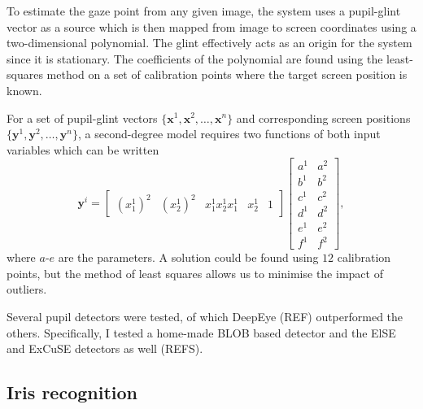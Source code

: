 To estimate the gaze point from any given image, the system uses a pupil-glint vector as a source which is then mapped from image to screen coordinates using a two-dimensional polynomial. The glint effectively acts as an origin for the system since it is stationary. The coefficients of the polynomial are found using the least-squares method on a set of calibration points where the target screen position is known.

For a set of pupil-glint vectors $\{\mathbf{x}^1, \mathbf{x}^2, \dots, \mathbf{x}^n\}$ and corresponding screen positions $\{\mathbf{y}^1, \mathbf{y}^2, \dots, \mathbf{y}^n\}$, a second-degree model requires two functions of both input variables which can be written
\begin{equation}
    \mathbf{y}^i =  \begin{bmatrix}
        \left(x_1^{1}\right)^2 & \left(x_2^{1}\right)^2 & x_1^1x_2^1 x_1^1 & x_2^1 & 1\end{bmatrix} \begin{bmatrix}a^1&a^2\\ b^1&b^2\\ c^1&c^2\\ d^1&d^2\\ e^1&e^2\\ f^1&f^2\end{bmatrix},
\end{equation}
where $a$-$e$ are the parameters. A solution could be found using $12$ calibration points, but the method of least squares allows us to minimise the impact of outliers.

Several pupil detectors were tested, of which DeepEye (REF) outperformed the others. Specifically, I tested a home-made BLOB based detector and the ElSE and ExCuSE detectors as well (REFS).

\subsection{Iris recognition}





